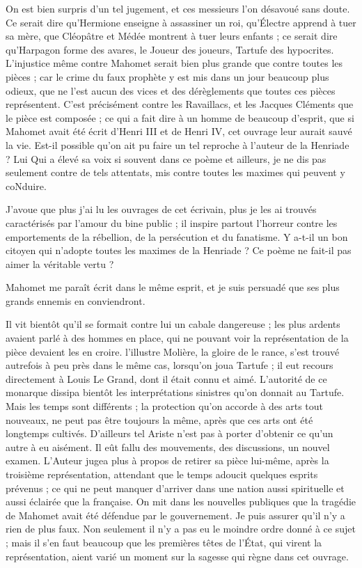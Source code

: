 \documentclass[french,twoside]{book} %
\begin{document}
On est bien surpris d’un tel jugement, et ces messieurs l’on désavoué sans doute. Ce serait dire qu’Hermione enseigne à assassiner un roi, qu’Électre apprend à tuer sa mère, que Cléopâtre et Médée montrent à tuer leurs enfants ; ce serait dire qu’Harpagon forme des avares, le Joueur des joueurs, Tartufe des hypocrites. L’injustice même contre Mahomet serait bien plus grande que contre toutes les pièces ; car le crime du faux prophète y est mis dans un jour beaucoup plus odieux, que ne l’est aucun des vices et des dérèglements que toutes ces pièces représentent. C’est précisément contre les Ravaillacs, et les Jacques Cléments que le pièce est composée ; ce qui a fait dire à un homme de beaucoup d’esprit, que si Mahomet avait été écrit d’Henri III et de Henri IV, cet ouvrage leur aurait sauvé la vie. Est-il possible qu’on ait pu faire un tel reproche à l’auteur de la Henriade ? Lui Qui a élevé sa voix si souvent dans ce poème et ailleurs, je ne dis pas seulement contre de tels attentats, mis contre toutes les maximes qui peuvent y coNduire.\par
J’avoue que plus j’ai lu les ouvrages de cet écrivain, plus je les ai trouvés caractérisés par l’amour du bine public ; il inspire partout l’horreur contre les emportements de la rébellion, de la persécution et du fanatisme. Y a-t-il un bon citoyen qui n’adopte toutes les maximes de la Henriade ? Ce poème ne fait-il pas aimer la véritable vertu ?\par
Mahomet me paraît écrit dans le même esprit, et je suis persuadé que ses plus grands ennemis en conviendront.\par
Il vit bientôt qu’il se formait contre lui un cabale dangereuse ; les plus ardents avaient parlé à des hommes en place, qui ne pouvant voir la représentation de la pièce devaient les en croire. l’illustre Molière, la gloire de le rance, s’est trouvé autrefois à peu près dans le même cas, lorsqu’on joua Tartufe ; il eut recours directement à Louis Le Grand, dont il était connu et aimé. L’autorité de ce monarque dissipa bientôt les interprétations sinistres qu’on donnait au Tartufe. Mais les temps sont différents ; la protection qu’on accorde à des arts tout nouveaux, ne peut pas être toujours la même, après que ces arts ont été longtemps cultivés. D’ailleurs tel Ariste n’est pas à porter d’obtenir ce qu’un autre à eu aisément. Il eût fallu des mouvements, des discussions, un nouvel examen. L’Auteur jugea plus à propos de retirer sa pièce lui-même, après la troisième représentation, attendant que le temps adoucit quelques esprits prévenus ; ce qui ne peut manquer d’arriver dans une nation aussi spirituelle et aussi éclairée que la française. On mit dans les nouvelles publiques que la tragédie de Mahomet avait été défendue par le gouvernement. Je puis assurer qu’il n’y a rien de plus faux. Non seulement il n’y a pas eu le moindre ordre donné à ce sujet ; mais il s’en faut beaucoup que les premières têtes de l’État, qui virent la représentation, aient varié un moment sur la sagesse qui règne dans cet ouvrage.\par
\end{document}
